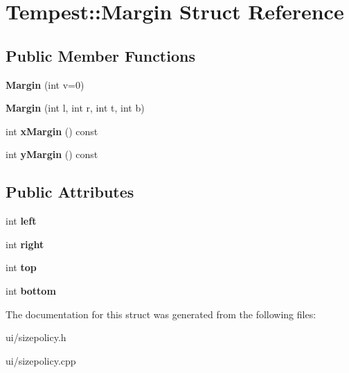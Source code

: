 \hypertarget{struct_tempest_1_1_margin}{\section{Tempest\+:\+:Margin Struct Reference}
\label{struct_tempest_1_1_margin}
}
\subsection*{Public Member Functions}
\begin{DoxyCompactItemize}
\item 
\hypertarget{struct_tempest_1_1_margin_a2e37426df7b0952b87ec7cbd806f53a3}{{\bfseries Margin} (int v=0)}\label{struct_tempest_1_1_margin_a2e37426df7b0952b87ec7cbd806f53a3}

\item 
\hypertarget{struct_tempest_1_1_margin_a998db39c64860a9eb40186e372d453f1}{{\bfseries Margin} (int l, int r, int t, int b)}\label{struct_tempest_1_1_margin_a998db39c64860a9eb40186e372d453f1}

\item 
\hypertarget{struct_tempest_1_1_margin_a4711b2321ca371f4521877fea8655eed}{int {\bfseries x\+Margin} () const }\label{struct_tempest_1_1_margin_a4711b2321ca371f4521877fea8655eed}

\item 
\hypertarget{struct_tempest_1_1_margin_a3df2807dd037bf92c576734622394353}{int {\bfseries y\+Margin} () const }\label{struct_tempest_1_1_margin_a3df2807dd037bf92c576734622394353}

\end{DoxyCompactItemize}
\subsection*{Public Attributes}
\begin{DoxyCompactItemize}
\item 
\hypertarget{struct_tempest_1_1_margin_a1999979213549ef3a5e0dd736dc4c1e5}{int {\bfseries left}}\label{struct_tempest_1_1_margin_a1999979213549ef3a5e0dd736dc4c1e5}

\item 
\hypertarget{struct_tempest_1_1_margin_a2bcd64543e40c960b929397ef5f18782}{int {\bfseries right}}\label{struct_tempest_1_1_margin_a2bcd64543e40c960b929397ef5f18782}

\item 
\hypertarget{struct_tempest_1_1_margin_adbd8d586231f72200134d779bcd35730}{int {\bfseries top}}\label{struct_tempest_1_1_margin_adbd8d586231f72200134d779bcd35730}

\item 
\hypertarget{struct_tempest_1_1_margin_a0bdd9013a034d4195d57507c403eac17}{int {\bfseries bottom}}\label{struct_tempest_1_1_margin_a0bdd9013a034d4195d57507c403eac17}

\end{DoxyCompactItemize}


The documentation for this struct was generated from the following files\+:\begin{DoxyCompactItemize}
\item 
ui/sizepolicy.\+h\item 
ui/sizepolicy.\+cpp\end{DoxyCompactItemize}
